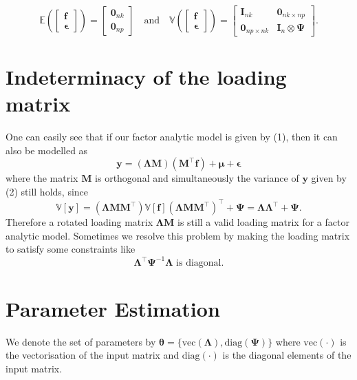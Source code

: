 \documentclass[
  a4paper,
  oneside,
  openany,
  12pt,
  onecolumn,
  twoside]{book}
\theoremstyle{plain}
\theoremstyle{remark}
\begin{document}
\[\mathbb{E}\left(\begin{bmatrix}\boldsymbol{f}\\\boldsymbol{\epsilon}\end{bmatrix}\right) = \begin{bmatrix}\boldsymbol{0}_{nk}\\\boldsymbol{0}_{np}\end{bmatrix}\quad\text{and}\quad\mathbb{V}\left(\begin{bmatrix}\boldsymbol{f}\\\boldsymbol{\epsilon}\end{bmatrix}\right) =\begin{bmatrix}\mathbf{I}_{nk} & \mathbf{0}_{nk\times np}\\\mathbf{0}_{np\times nk} & \mathbf{I}_n \otimes \mathbf{\Psi}\end{bmatrix}.\]

\section{Indeterminacy of the loading
matrix}\label{indeterminacy-of-the-loading-matrix}

One can easily see that if our factor analytic model is given by (1),
then it can also be modelled as
\[\boldsymbol{y}=(\boldsymbol{\Lambda}\boldsymbol{M})(\boldsymbol{M}^\top\boldsymbol{f}) +\boldsymbol{\mu}+\boldsymbol{\epsilon}\]
where the matrix \(\boldsymbol{M}\) is orthogonal and simultaneously the
variance of \(\boldsymbol{y}\) given by (2) still holds, since
\[\mathbb{V}[\boldsymbol{y}]=(\boldsymbol{\Lambda}\boldsymbol{M}\boldsymbol{M}^\top)\mathbb{V}[\boldsymbol{f}](\boldsymbol{\Lambda}\boldsymbol{M}\boldsymbol{M}^\top)^\top+\boldsymbol{\Psi}=\boldsymbol{\Lambda}\boldsymbol{\Lambda}^\top+\boldsymbol{\Psi}.\]
Therefore a rotated loading matrix
\(\boldsymbol{\Lambda}\boldsymbol{M}\) is still a valid loading matrix
for a factor analytic model. Sometimes we resolve this problem by making
the loading matrix to satisfy some constraints like
\citep{mardiaMultivariateAnalysis1979}
\[\boldsymbol{\Lambda}^\top \boldsymbol{\Psi}^{-1} \boldsymbol{\Lambda} \text{ is diagonal.}\]

\section{Parameter Estimation}\label{parameter-estimation}

We denote the set of parameters by
\(\boldsymbol{\theta} = \{\text{vec}(\boldsymbol{\Lambda}), \text{diag}(\boldsymbol{\Psi})\}\)
where \(\text{vec}(\cdot)\) is the vectorisation of the input matrix and
\(\text{diag}(\cdot)\) is the diagonal elements of the input matrix.
\end{document}
